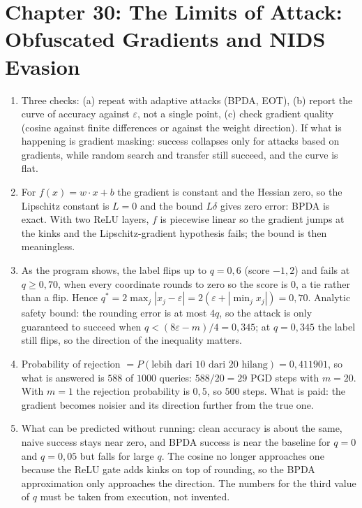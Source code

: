 \section*{Chapter 30: The Limits of Attack: Obfuscated Gradients and NIDS Evasion}
\begin{enumerate}[label=\textbf{30.\arabic*}]
  \item Three checks: (a) repeat with adaptive attacks (BPDA, EOT), (b)
        report the curve of accuracy against $\varepsilon$, not a single point, (c) check
        gradient quality (cosine against finite differences or against the weight direction). If
        what is happening is gradient masking: success collapses only for attacks
        based on gradients, while random search and transfer still succeed, and
        the curve is flat.

  \item For $f(x)=w\cdot x+b$ the gradient is constant and the Hessian zero, so the
        Lipschitz constant is $L=0$ and the bound $L\delta$ gives zero error: BPDA is exact. With two
        ReLU layers, $f$ is piecewise linear so the gradient jumps at the
        kinks and the Lipschitz-gradient hypothesis fails; the bound is then
        meaningless.

  \item 
As the program shows, the label flips up to $q=0{,}6$ (score $-1{,}2$) and
        fails at $q\ge0{,}70$, when every coordinate rounds to zero so the score is
        $0$, a tie rather than a flip. Hence
        $q^{*}=2\max_{j}|x_{j}-\varepsilon|=2(\varepsilon+|\min_{j}x_{j}|)=0{,}70$.
        Analytic safety bound: the rounding error is at most $4q$, so the attack is
        only guaranteed to succeed when $q<(8\varepsilon-m)/4=0{,}345$; at $q=0{,}345$
        the label still flips, so the direction of the inequality matters.

  \item Probability of rejection $=P(\text{lebih dari }10\text{ dari }20\text{ hilang})
        =0{,}411901$, so what is answered is $588$ of $1000$ queries: $588/20=29$
        PGD steps with $m=20$. With $m=1$ the rejection probability is $0{,}5$, so $500$
        steps. What is paid: the gradient becomes noisier and its direction further from the true one.

  \item What can be predicted without running: clean accuracy is about the same,
        naive success stays near zero, and BPDA success is near the baseline for $q=0$
        and $q=0{,}05$ but falls for large $q$. The cosine no longer approaches one
        because the ReLU gate adds kinks on top of rounding, so the BPDA approximation
        only approaches the direction. The numbers for the third value of $q$ must be taken from execution,
        not invented.


\end{enumerate}
